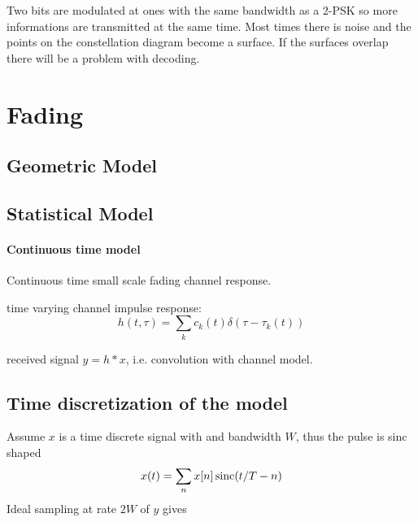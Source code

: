 Two bits are modulated at ones with the same bandwidth as a 2-PSK so more informations are transmitted at the same time. \cite{Meyer2011}
Most times there is noise and the points on the constellation diagram become a surface. 
If the surfaces overlap there will be a problem with decoding. 

\section{Fading}

\subsection{Geometric Model}


\subsection{Statistical Model}


\paragraph{Continuous time model}

Continuous time small scale fading channel response.

time varying channel impulse response:
\begin{equation}
	h(t, \tau) = \sum_k c_k (t) \delta(\tau - \tau_k(t))
\end{equation}

received signal \(y = h * x\), i.e. convolution with channel model. 

\subsection{Time discretization of the model}


Assume \(x\) is a time discrete signal with and bandwidth \(W\), thus the pulse is sinc shaped
\begin{equation}
	x(t) = \sum_n x[n] \operatorname{sinc}(t/T - n)
\end{equation}
Ideal sampling at rate \(2W\) of \(y\) gives
